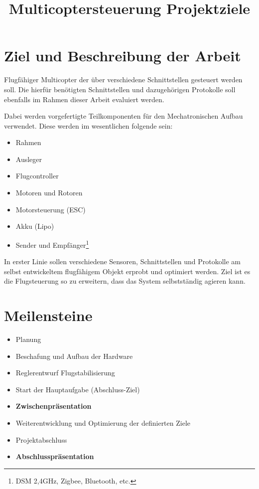 \documentclass[12pt,a4paper]{article}
\title{Multicoptersteuerung Projektziele}
\begin{document}
\maketitle

\section{Ziel und Beschreibung der Arbeit}
	Flugfähiger Multicopter der über verschiedene Schnittstellen gesteuert werden soll.
	Die hierfür benötigten Schnittstellen und dazugehörigen Protokolle soll ebenfalls im Rahmen dieser Arbeit 
	evaluiert werden.
	
	Dabei werden vorgefertigte Teilkomponenten für den Mechatronischen Aufbau verwendet. Diese werden 
	im wesentlichen folgende sein:
	\begin{itemize}
		\item	Rahmen
		\item	Ausleger
		\item	Flugcontroller
		\item	Motoren und Rotoren 
		\item	Motorsteuerung (ESC)
		\item	Akku (Lipo)
		\item	Sender und Empfänger\footnote{DSM 2,4GHz, Zigbee, Bluetooth, etc.}
	\end{itemize}
	
	In erster Linie sollen verschiedene Sensoren, Schnittstellen und Protokolle am selbst entwickeltem flugfähigem Objekt erprobt und 
	optimiert werden. Ziel ist es die Flugsteuerung so zu erweitern, dass das System selbstständig agieren kann.

\section{Meilensteine}
	\begin{itemize}
		\item	Planung
		\item	Beschafung und Aufbau der Hardware
		\item	Reglerentwurf Flugstabilisierung
		\item	Start der Hauptaufgabe (Abschluss-Ziel)
		\item 	\textbf{Zwischenpräsentation} 
		\item 	Weiterentwicklung und Optimierung der definierten Ziele
		\item 	Projektabschluss
		\item 	\textbf{Abschlusspräsentation} 
	\end{itemize}
	
\end{document}
